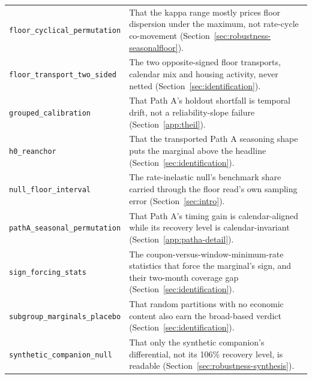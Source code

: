 \documentclass[12pt]{article}
\begin{document}
{\begin{longtable}{@{}p{5.4cm}p{8.8cm}@{}}
\texttt{floor\_cyclical\_permutation} & That the kappa range mostly prices floor dispersion under the maximum, not rate-cycle co-movement (Section~\ref{sec:robustness-seasonalfloor}). \\
\texttt{floor\_transport\_two\_sided} & The two opposite-signed floor transports, calendar mix and housing activity, never netted (Section~\ref{sec:identification}). \\
\texttt{grouped\_calibration} & That Path A's holdout shortfall is temporal drift, not a reliability-slope failure (Section~\ref{app:theil}). \\
\texttt{h0\_reanchor} & That the transported Path A seasoning shape puts the marginal above the headline (Section~\ref{sec:identification}). \\
\texttt{null\_floor\_interval} & The rate-inelastic null's benchmark share carried through the floor read's own sampling error (Section~\ref{sec:intro}). \\
\texttt{pathA\_seasonal\_permutation} & That Path A's timing gain is calendar-aligned while its recovery level is calendar-invariant (Section~\ref{app:patha-detail}). \\
\texttt{sign\_forcing\_stats} & The coupon-versus-window-minimum-rate statistics that force the marginal's sign, and their two-month coverage gap (Section~\ref{sec:identification}). \\
\texttt{subgroup\_marginals\_placebo} & That random partitions with no economic content also earn the broad-based verdict (Section~\ref{sec:identification}). \\
\texttt{synthetic\_companion\_null} & That only the synthetic companion's differential, not its 106\% recovery level, is readable (Section~\ref{sec:robustness-synthesis}). \\
\bottomrule
\end{longtable}
}
\end{document}
